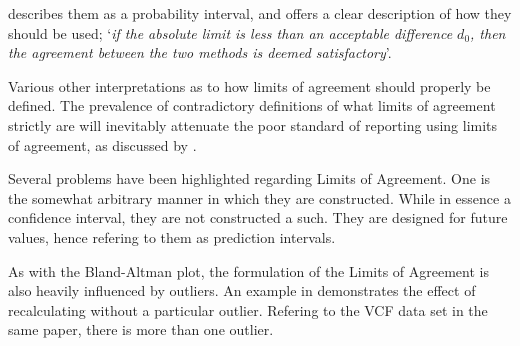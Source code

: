 \documentclass[12pt, a4paper]{report}
\theoremstyle{plain}
\theoremstyle{definition}
\theoremstyle{remark}
\begin{document}
\citet{Barnhart} describes them as a probability interval, and offers a clear description of how they should be used; `\textit{if the absolute limit is less than an acceptable difference $d_{0}$, then the agreement between the two methods is deemed satisfactory}'.

Various other interpretations as to how limits of agreement should properly be defined. The prevalence of contradictory definitions of what limits of agreement strictly are will inevitably attenuate the poor standard of reporting using limits of agreement, as discussed by \citet{mantha}.









Several problems have been highlighted regarding Limits of
Agreement. One is the somewhat arbitrary manner in which they are
constructed. While in essence a confidence interval, they are not
constructed a such. They are designed for future values, hence \citet{BXC2008} refering to them as prediction intervals.

As with the Bland-Altman plot, the formulation of the Limits of Agreement is also heavily influenced by outliers. An example
in \citet*{BA83} demonstrates the effect of recalculating without
a particular outlier. Refering to the VCF data set in the same
paper, there is more than one outlier.





\end{document}
